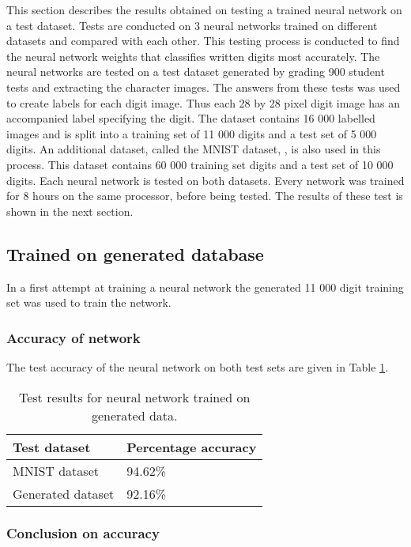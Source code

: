 This section describes the results obtained on testing a trained neural network on a test dataset. Tests are conducted on 3 neural networks trained on different datasets and compared with each other. This testing process is conducted to find the neural network weights that classifies written digits most accurately. The neural networks are tested on a test dataset generated by grading 900 student tests and extracting the character images. The answers from these tests was used to create labels for each digit image. Thus each 28 by 28 pixel digit image has an accompanied label specifying the digit. The dataset contains 16 000 labelled images and is split into a training set of 11 000 digits and a test set of 5 000 digits. An additional dataset, called the MNIST dataset, \citep{mnist}, is also used in this process. This dataset contains 60 000 training set digits and a test set of 10 000 digits. Each neural network is tested on both datasets. Every network was trained for 8 hours on the same processor, before being tested. The results of these test is shown in the next section.
\subsection{Trained on generated database}
In a first attempt at training a neural network the generated 11 000 digit training set was used to train the network.

\subsubsection{Accuracy of network}

The test accuracy of the neural network on both test sets are given in Table \ref{tbl:nnResult1}.

\begin{table}[h]
\caption{Test results for neural network trained on generated data.} \label{tbl:nnResult1}
  \centering
\begin{tabular}{|p{4cm}|p{5cm}|}
\hline
\textbf{Test dataset}&\textbf{Percentage accuracy}\\
\hline
MNIST dataset&94.62\%\\
\hline
Generated dataset&92.16\%\\
\hline
\end{tabular}
\end{table}

\subsubsection{Conclusion on accuracy}

